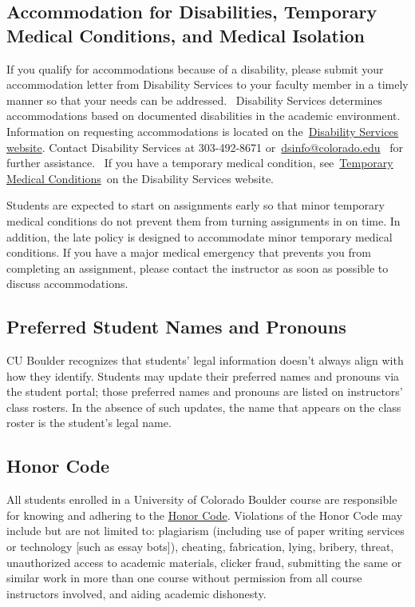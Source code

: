\subsection*{Accommodation for Disabilities, Temporary Medical Conditions, and
Medical Isolation}

If you qualify for accommodations because of a disability, please submit
your accommodation letter from Disability Services to your faculty
member in a timely manner so that your needs can be addressed.~
Disability Services determines accommodations based on documented
disabilities in the academic environment.~ Information on requesting
accommodations is located on
the~\href{https://www.colorado.edu/disabilityservices/}{{Disability
Services website}}. Contact Disability Services at 303-492-8671
or~\href{mailto:dsinfo@colorado.edu}{{dsinfo@colorado.edu}}~ for further
assistance.~ If you have a temporary medical condition,
see~\href{https://www.colorado.edu/disabilityservices/students/temporary-medical-conditions}{{Temporary
Medical Conditions}}~on the Disability Services website.

Students are expected to start on assignments early so that minor temporary medical conditions do not prevent them from turning assignments in on time. In addition, the late policy is designed to accommodate minor temporary medical conditions. If you have a major medical emergency that prevents you from completing an assignment, please contact the instructor as soon as possible to discuss accommodations.

\subsection*{Preferred Student Names and Pronouns}

CU Boulder recognizes that students' legal information doesn't always
align with how they identify. Students may update their preferred names
and pronouns via the student portal; those preferred names and pronouns
are listed on instructors' class rosters. In the absence of such
updates, the name that appears on the class roster is the student's
legal name.

\subsection*{Honor Code}

All students enrolled in a University of Colorado Boulder course are
responsible for knowing and adhering to the
\href{https://www.colorado.edu/sccr/honor-code}{{Honor Code}}.
Violations of the Honor Code may include but are not limited to:
plagiarism (including use of paper writing services or technology
{[}such as essay bots{]}), cheating, fabrication, lying, bribery,
threat, unauthorized access to academic materials, clicker fraud,
submitting the same or similar work in more than one course without
permission from all course instructors involved, and aiding academic
dishonesty.

